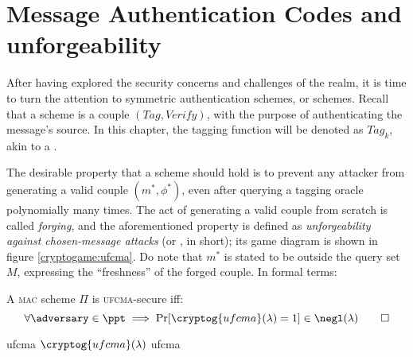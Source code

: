 
\section{Message Authentication Codes and unforgeability}

After having explored the security concerns and challenges of the \ske{} realm, it is time to turn the attention to symmetric authentication schemes, or \mac{} schemes. Recall that a \mac{} scheme is a couple $(\textit{Tag}, \textit{Verify})$, with the purpose of authenticating the message's source. In this chapter, the tagging function will be denoted as $\textit{Tag}_k$, akin to a \prf.

The desirable property that a \mac{} scheme should hold is to prevent any attacker from generating a valid couple $(m^*, \phi^*)$, even after querying a tagging oracle polynomially many times\footnotemark.
The act of generating a valid couple from scratch is called \emph{forging}, and the aforementioned property is defined as \emph{unforgeability against chosen-message attacks} (or \ufcma, in short); its game diagram is shown in figure \ref{cryptogame:ufcma}. Do note that $m^*$ is stated to be outside the query set $M$, expressing the ``freshness'' of the forged couple\footnotemark. In formal terms:


\begin{definition}
    A \textsc{mac} scheme $\Pi$ is \textsc{ufcma}-secure iff:
    \[
        \forall \adversary \in \ppt \implies \Pr[\cryptog{ufcma}(\lambda) = 1] \in \negl(\lambda) \qedhere
    \]
\end{definition}

\begin{cryptogame}
    {ufcma}
    {$\cryptog{ufcma}(\lambda)$}
    {ufcma}


    \cseqbeginloop
    \cseqendloop
    
    \cseqdelay

    
\end{cryptogame}


